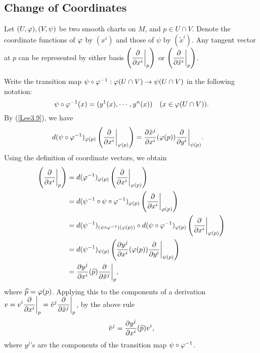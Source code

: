 \subsection{Change of Coordinates}
Let $(U,\varphi), (V,\psi)$ be two smooth charts on $M$, and $p \in U \cap V$. Denote the coordinate functions of $\varphi$ by $(x^i)$ and those of $\psi$ by $(\tilde{x}^i)$.
Any tangent vector at $p$ can be represented by either basis $\displaystyle{\left(\pdv{}{x^i}\bigg|_p\right)}$ or $\displaystyle{\left(\pdv{}{\tilde{x}^i}\bigg|_p\right)}$.

Write the transition map $\psi \circ \varphi^{-1}: \varphi(U \cap V) \to \psi(U \cap V)$ in the following notation:
$$\psi \circ \varphi^{-1}(x) = (y^1(x), \cdots, y^n(x)) \quad (x \in \varphi(U \cap V)). $$
By (\ref{Lee3.9}), we have 
\begin{align*}
    d(\psi \circ \varphi^{-1})_{\varphi(p)}\left( \pdv{}{x^i}\bigg|_{\varphi(p)} \right)
    &= {\pdv{\Tilde{x}^j}{x^i}} (\varphi(p))  \pdv{}{y^i}\bigg|_{\psi(p)} .
\end{align*}
Using the definition of coordinate vectors, we obtain
\begin{align*}
    \left(\pdv{}{x^i}\bigg|_p\right)
    &= d(\varphi^{-1})_{\varphi(p)}\left( \pdv{}{x^i}\bigg|_{\varphi(p)} \right) \\
    &= d(\psi^{-1} \circ \psi \circ \varphi^{-1})_{\varphi(p)} \left( \pdv{}{x^i}\bigg|_{\varphi(p)} \right) \\
    &= d(\psi^{-1})_{(\psi \circ \varphi^{-1})(\varphi(p))} \circ d(\psi \circ \varphi^{-1})_{\varphi(p)} \left( \pdv{}{x^i}\bigg|_{\varphi(p)} \right) \\
    &= d(\psi^{-1})_{\psi(p)} \left(  {\pdv{y^j}{x^i}} (\varphi(p)) \pdv{}{y^i}\bigg|_{\psi(p)}  \right) \\
    &= {\pdv{y^j}{x^i}}(\widehat{p}) \pdv{}{\tilde{x}^j}\bigg|_p,
\end{align*}
where $\widehat{p} = \varphi(p)$.
Applying this to the components of a derivation $\displaystyle{v = v^i \pdv{}{x^i}\bigg|_p = \Tilde{v}^j\pdv{}{\Tilde{x}^j}\bigg|_p }$, by the above rule
$$\Tilde{v}^j = {\pdv{y^j}{x^i}}(\widehat{p})v^i, $$
where $y^j$'s are the components of the transition map $\psi \circ \varphi^{-1}$.
